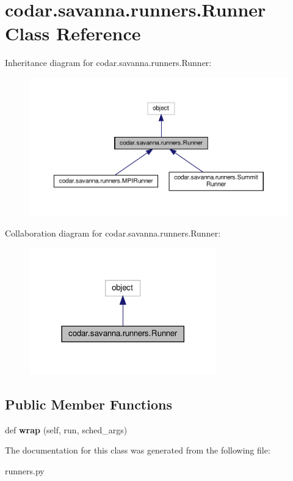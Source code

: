 \hypertarget{classcodar_1_1savanna_1_1runners_1_1_runner}{}\section{codar.\+savanna.\+runners.\+Runner Class Reference}
\label{classcodar_1_1savanna_1_1runners_1_1_runner}


Inheritance diagram for codar.\+savanna.\+runners.\+Runner\+:
\nopagebreak
\begin{figure}[H]
\begin{center}
\leavevmode
\includegraphics[width=350pt]{classcodar_1_1savanna_1_1runners_1_1_runner__inherit__graph}
\end{center}
\end{figure}


Collaboration diagram for codar.\+savanna.\+runners.\+Runner\+:
\nopagebreak
\begin{figure}[H]
\begin{center}
\leavevmode
\includegraphics[width=230pt]{classcodar_1_1savanna_1_1runners_1_1_runner__coll__graph}
\end{center}
\end{figure}
\subsection*{Public Member Functions}
\begin{DoxyCompactItemize}
\item 
\mbox{\label{classcodar_1_1savanna_1_1runners_1_1_runner_a7e8a83cd991c604a5238af27bdc6e013}} 
def {\bfseries wrap} (self, run, sched\+\_\+args)
\end{DoxyCompactItemize}


The documentation for this class was generated from the following file\+:\begin{DoxyCompactItemize}
\item 
runners.\+py\end{DoxyCompactItemize}
